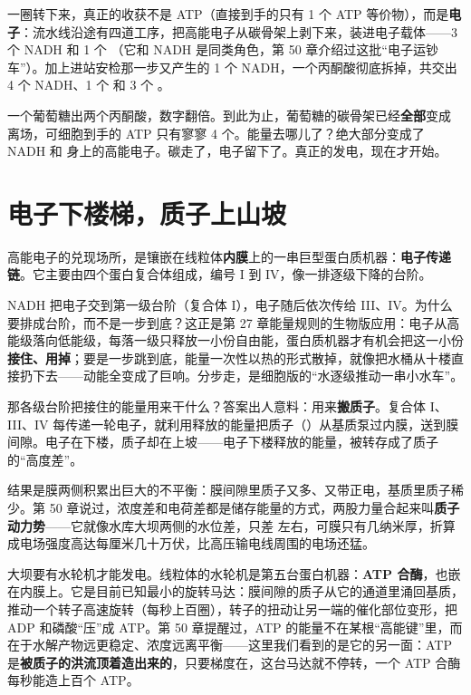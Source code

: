 一圈转下来，真正的收获不是 ATP（直接到手的只有 1 个 ATP 等价物），而是\textbf{电子}：流水线沿途有四道工序，把高能电子从碳骨架上剥下来，装进电子载体——3 个 NADH 和 1 个 （它和 NADH 是同类角色，第 50 章介绍过这批“电子运钞车”）。加上进站安检那一步又产生的 1 个 NADH，一个丙酮酸彻底拆掉，共交出 4 个 NADH、1 个  和 3 个 。

一个葡萄糖出两个丙酮酸，数字翻倍。到此为止，葡萄糖的碳骨架已经\textbf{全部}变成  离场，可细胞到手的 ATP 只有寥寥 4 个。能量去哪儿了？绝大部分变成了 NADH 和  身上的高能电子。碳走了，电子留下了。真正的发电，现在才开始。

\section{电子下楼梯，质子上山坡}

高能电子的兑现场所，是镶嵌在线粒体\textbf{内膜}上的一串巨型蛋白质机器：\textbf{电子传递链}。它主要由四个蛋白复合体组成，编号 I 到 IV，像一排逐级下降的台阶。

NADH 把电子交到第一级台阶（复合体 I），电子随后依次传给 III、IV。为什么要排成台阶，而不是一步到底？这正是第 27 章能量规则的生物版应用：电子从高能级落向低能级，每落一级只释放一小份自由能，蛋白质机器才有机会把这一小份\textbf{接住、用掉}；要是一步跳到底，能量一次性以热的形式散掉，就像把水桶从十楼直接扔下去——动能全变成了巨响。分步走，是细胞版的“水逐级推动一串小水车”。

那各级台阶把接住的能量用来干什么？答案出人意料：用来\textbf{搬质子}。复合体 I、III、IV 每传递一轮电子，就利用释放的能量把质子（）从基质泵过内膜，送到膜间隙。电子在下楼，质子却在上坡——电子下楼释放的能量，被转存成了质子的“高度差”。

结果是膜两侧积累出巨大的不平衡：膜间隙里质子又多、又带正电，基质里质子稀少。第 50 章说过，浓度差和电荷差都是储存能量的方式，两股力量合起来叫\textbf{质子动力势}——它就像水库大坝两侧的水位差，只差  左右，可膜只有几纳米厚，折算成电场强度高达每厘米几十万伏，比高压输电线周围的电场还猛。

大坝要有水轮机才能发电。线粒体的水轮机是第五台蛋白机器：\textbf{ATP 合酶}，也嵌在内膜上。它是目前已知最小的旋转马达：膜间隙的质子从它的通道里涌回基质，推动一个转子高速旋转（每秒上百圈），转子的扭动让另一端的催化部位变形，把 ADP 和磷酸“压”成 ATP。第 50 章提醒过，ATP 的能量不在某根“高能键”里，而在于水解产物远更稳定、浓度远离平衡——这里我们看到的是它的另一面：ATP 是\textbf{被质子的洪流顶着造出来的}，只要梯度在，这台马达就不停转，一个 ATP 合酶每秒能造上百个 ATP。

